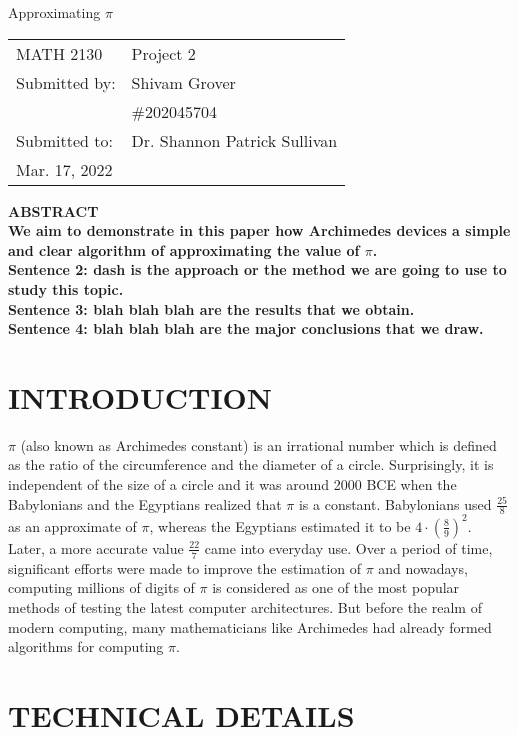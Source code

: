 \documentclass[12pt]{article}
\begin{document}
\begin{titlepage}
\begin{center}
\large Approximating $\displaystyle \pi$
\end{center}
\vspace{6cm}
\hfill\begin{tabular}{ll}
MATH 2130 & Project 2 \\
Submitted by: & Shivam Grover \\
& \#202045704 \\
Submitted to: & Dr. Shannon Patrick Sullivan \\
Mar. 17, 2022

\end{tabular}
\end{titlepage}

\bf{ABSTRACT} \\
We aim to demonstrate in this paper how Archimedes devices a simple and clear
algorithm of approximating the value of $\pi$.\\
Sentence 2: dash is the approach or the method we are going to use to study this topic.\\
Sentence 3: blah blah blah are the results that we obtain.\\
Sentence 4: blah blah blah are the major conclusions that we draw.\\

\section {INTRODUCTION}
$\pi$ (also known as Archimedes constant) is an irrational number which is defined as the ratio of the circumference and the diameter of a circle. Surprisingly, it is independent of the size of a circle and it was around 2000 BCE when the Babylonians and the Egyptians realized that $\pi$ is a constant. Babylonians used $\frac{25}{8}$ as an approximate of $\pi$, whereas the Egyptians estimated it to be $4\cdot(\frac{8}{9})^2$. Later, a more accurate value $\frac{22}{7}$ came into everyday use. Over a period of time, significant efforts were made to improve the estimation of $\pi$ and nowadays, computing millions of digits of $\pi$  is considered as one of the most popular methods of testing the latest computer architectures. But before the realm of modern computing, many mathematicians like Archimedes had already formed algorithms for computing $\pi$.


\section {TECHNICAL DETAILS}
\iffalse It gives the mathematical background of the topic and states the methodology used for studying the topic. Can also include computer program. If run for 5 or 6 pages, then you should make sub sections for background, methodology and code. You should explain the inputs of the program, explain what the programs does on higher level and what are the outputs of the program.\fi
\end{document}
